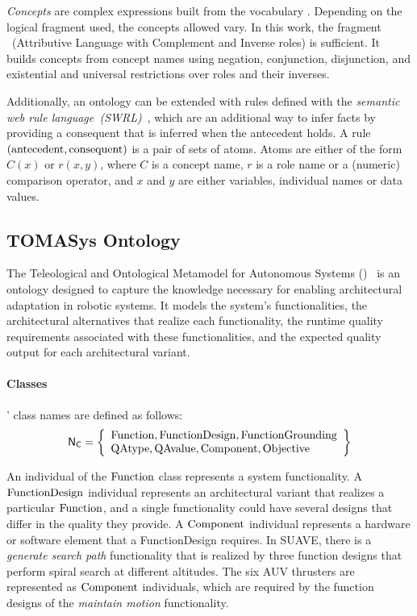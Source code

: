 \emph{Concepts} are complex expressions built from the vocabulary \N. Depending on the logical fragment used, the concepts allowed vary.
In this work, the fragment \ALCI~(Attributive Language with Complement and Inverse roles) is sufficient. It builds concepts from concept names using negation, conjunction, disjunction, and existential and universal restrictions over roles and their inverses.

Additionally, an ontology can be extended with rules defined with the \emph{semantic web rule language~(SWRL)}~\cite{HorrocksPBTG2004}, which are an additional way to infer facts by providing a consequent that is inferred when the antecedent holds. A rule $(\operatorname{antecedent}, \operatorname{consequent})$ is a pair of sets of atoms. Atoms are either of the form $C(x)$ or $r(x,y)$, where $C$ is a concept name, $r$ is a role name or a (numeric) comparison operator, and $x$ and $y$ are either variables, individual names or data values.



\subsection{TOMASys Ontology}\label{planta:sec:bg_tomasys}

The Teleological and Ontological Metamodel for Autonomous Systems (\tomasys)~\cite{aguado2021functional,corbato2013model} is an ontology designed to capture the knowledge necessary for enabling architectural adaptation in robotic systems. It models the system's functionalities, the architectural alternatives that realize each functionality, the runtime quality requirements associated with these functionalities, and the expected quality output for each architectural variant.

\paragraph{Classes}
\tomasys' class names \NC are defined as follows:
\[
\mathsf{N}_\mathsf{C} = \left\lbrace \begin{array}{l}
  \operatorname{Function}, \operatorname{FunctionDesign}, \operatorname{FunctionGrounding} \\
  \operatorname{QAtype}, \operatorname{QAvalue},
  \operatorname{Component}, \operatorname{Objective}
\end{array}\right\rbrace
\]


An individual of the $\operatorname{Function}$ class represents a system functionality. A $\operatorname{FunctionDesign}$ individual represents an architectural variant that realizes a particular $\operatorname{Function}$, and a single functionality could have several designs that differ in the quality they provide. A $\operatorname{Component}$ individual represents a hardware or software element that a FunctionDesign requires. In SUAVE, there is a \emph{generate search path} functionality that is realized by three function designs that perform spiral search at different altitudes. The six AUV thrusters are represented as $\operatorname{Component}$ individuals, which are required by the function designs of the \emph{maintain motion} functionality.

